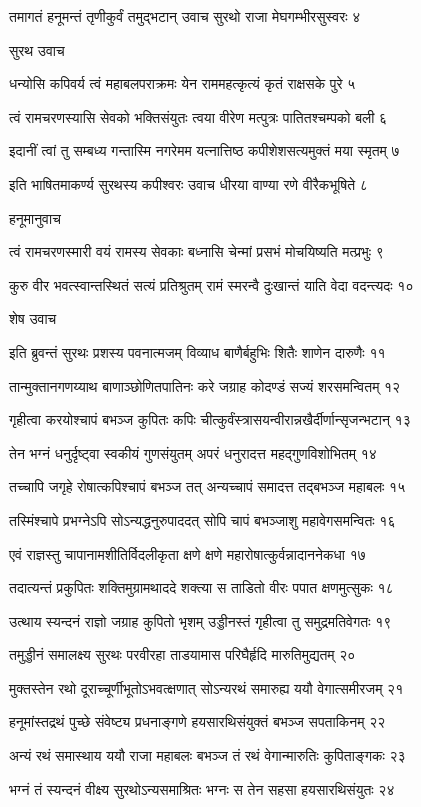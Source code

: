 तमागतं हनूमन्तं तृणीकुर्वं तमुद्भटान्
उवाच सुरथो राजा मेघगम्भीरसुस्वरः ४

सुरथ उवाच

धन्योसि कपिवर्य त्वं महाबलपराक्रमः
येन राममहत्कृत्यं कृतं राक्षसके पुरे ५

त्वं रामचरणस्यासि सेवको भक्तिसंयुतः
त्वया वीरेण मत्पुत्रः पातितश्चम्पको बली ६

इदानीं त्वां तु सम्बध्य गन्तास्मि नगरेमम
यत्नात्तिष्ठ कपीशेशसत्यमुक्तं मया स्मृतम् ७

इति भाषितमाकर्ण्य सुरथस्य कपीश्वरः
उवाच धीरया वाण्या रणे वीरैकभूषिते ८

हनूमानुवाच

त्वं रामचरणस्मारी वयं रामस्य सेवकाः
बध्नासि चेन्मां प्रसभं मोचयिष्यति मत्प्रभुः ९

कुरु वीर भवत्स्वान्तस्थितं सत्यं प्रतिश्रुतम्
रामं स्मरन्वै दुःखान्तं याति वेदा वदन्त्यदः १०

शेष उवाच

इति ब्रुवन्तं सुरथः प्रशस्य पवनात्मजम्
विव्याध बाणैर्बहुभिः शितैः शाणेन दारुणैः ११

तान्मुक्तानगणय्याथ बाणाञ्छोणितपातिनः
करे जग्राह कोदण्डं सज्यं शरसमन्वितम् १२

गृहीत्वा करयोश्चापं बभञ्ज कुपितः कपिः
चीत्कुर्वंस्त्रासयन्वीरान्नखैर्दीर्णान्सृजन्भटान् १३

तेन भग्नं धनुर्दृष्ट्वा स्वकीयं गुणसंयुतम्
अपरं धनुरादत्त महद्गुणविशोभितम् १४

तच्चापि जगृहे रोषात्कपिश्चापं बभञ्ज तत्
अन्यच्चापं समादत्त तद्बभञ्ज महाबलः १५

तस्मिंश्चापे प्रभग्नेऽपि सोऽन्यद्धनुरुपाददत्
सोपि चापं बभञ्जाशु महावेगसमन्वितः १६

एवं राज्ञस्तु चापानामशीतिर्विदलीकृता
क्षणे क्षणे महारोषात्कुर्वन्नादाननेकधा १७

तदात्यन्तं प्रकुपितः शक्तिमुग्रामथाददे
शक्त्या स ताडितो वीरः पपात क्षणमुत्सुकः १८

उत्थाय स्यन्दनं राज्ञो जग्राह कुपितो भृशम्
उड्डीनस्तं गृहीत्वा तु समुद्रमतिवेगतः १९

तमुड्डीनं समालक्ष्य सुरथः परवीरहा
ताडयामास परिघैर्हृदि मारुतिमुद्यतम् २०

मुक्तस्तेन रथो दूराच्चूर्णीभूतोऽभवत्क्षणात्
सोऽन्यरथं समारुह्य ययौ वेगात्समीरजम् २१

हनूमांस्तद्रथं पुच्छे संवेष्ट्य प्रधनाङ्गणे
हयसारथिसंयुक्तं बभञ्ज सपताकिनम् २२

अन्यं रथं समास्थाय ययौ राजा महाबलः
बभञ्ज तं रथं वेगान्मारुतिः कुपिताङ्गकः २३

भग्नं तं स्यन्दनं वीक्ष्य सुरथोऽन्यसमाश्रितः
भग्नः स तेन सहसा हयसारथिसंयुतः २४

